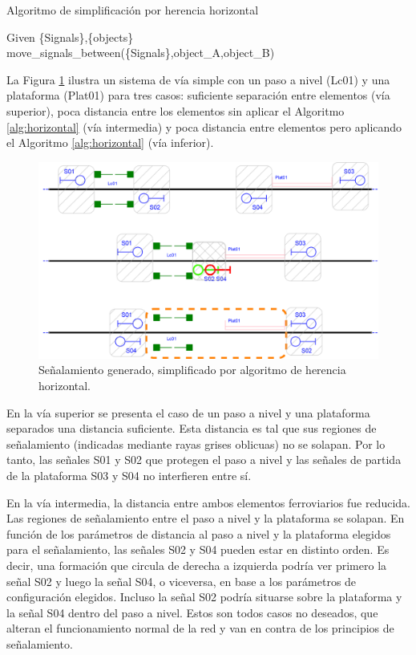 \begin{algorithm}[H]
	\caption{Algoritmo de simplificación por herencia horizontal}
	\label{alg:horizontal}
	\DontPrintSemicolon
	\SetNoFillComment
	\LinesNotNumbered 
	Given \{Signals\},\{objects\}\\
	{
		{
			{
				{
					move\_signals\_between(\{Signals\},object\_A,object\_B)
				}
			}
		}
	}
\end{algorithm}

La Figura \ref{fig:signal_horizontal} ilustra un sistema de vía simple con un paso a nivel (Lc01) y una plataforma (Plat01) para tres casos: suficiente separación entre elementos (vía superior), poca distancia entre los elementos sin aplicar el Algoritmo \ref{alg:horizontal} (vía intermedia) y poca distancia entre elementos pero aplicando el Algoritmo \ref{alg:horizontal} (vía inferior).

\begin{figure}[H]
	\centering
	\includegraphics[width=1\textwidth]{Figuras/proximity.PNG}
	\centering\caption{Señalamiento generado, simplificado por algoritmo de herencia horizontal.}
	\label{fig:signal_horizontal}
\end{figure}

En la vía superior se presenta el caso de un paso a nivel y una plataforma separados una distancia suficiente. Esta distancia es tal que sus regiones de señalamiento (indicadas mediante rayas grises oblicuas) no se solapan. Por lo tanto, las señales S01 y S02 que protegen el paso a nivel y las señales de partida de la plataforma S03 y S04 no interfieren entre sí.

En la vía intermedia, la distancia entre ambos elementos ferroviarios fue reducida. Las regiones de señalamiento entre el paso a nivel y la plataforma se solapan. En función de los parámetros de distancia al paso a nivel y la plataforma elegidos para el señalamiento, las señales S02 y S04 pueden estar en distinto orden. Es decir, una formación que circula de derecha a izquierda podría ver primero la señal S02 y luego la señal S04, o viceversa, en base a los parámetros de configuración elegidos. Incluso la señal S02 podría situarse sobre la plataforma y la señal S04 dentro del paso a nivel. Estos son todos casos no deseados, que alteran el funcionamiento normal de la red y van en contra de los principios de señalamiento.

